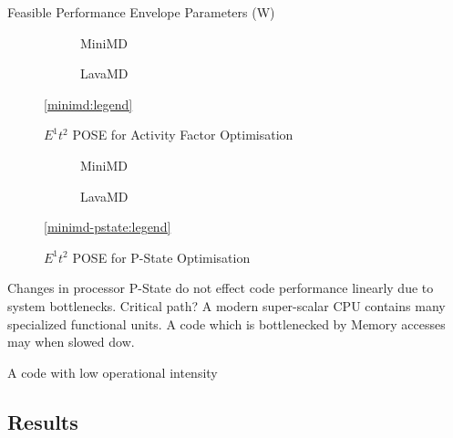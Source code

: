 \begin{table}
\centering
\caption{Feasible Performance Envelope Parameters (W)}

\end{table} 

\begin{figure}[t]%
	\providecommand{\plotwidth}{.95\linewidth}
  \begin{subfigure}[t]{.5\linewidth}%
    \caption{MiniMD}%
  \end{subfigure}%
  \begin{subfigure}[t]{.5\linewidth}%
    \caption{LavaMD}%
  \end{subfigure}%
  \begin{center}%
    \ref{minimd:legend}%
  \end{center}%
  \caption{$E^1t^2$ POSE for Activity Factor Optimisation}%
  \label{fig:minimd}%
\end{figure}

\begin{figure}[t]%
\begin{subfigure}[t]{.5\linewidth}%
\centering%
%
\caption{MiniMD}%
\end{subfigure}%
\begin{subfigure}[t]{.5\linewidth}%
%
\caption{LavaMD}%
\end{subfigure}%
\begin{center}%
\ref{minimd-pstate:legend}%
\end{center}%
\caption{$E^1t^2$ POSE for P-State Optimisation}%
\label{fig:pstates}%
\end{figure}%

Changes in processor P-State do not effect code performance linearly due to system bottlenecks. Critical path?  A modern super-scalar CPU contains many specialized functional units. A code which is bottlenecked by Memory accesses may when slowed dow.

A code with low operational intensity 


\subsection{Results}


